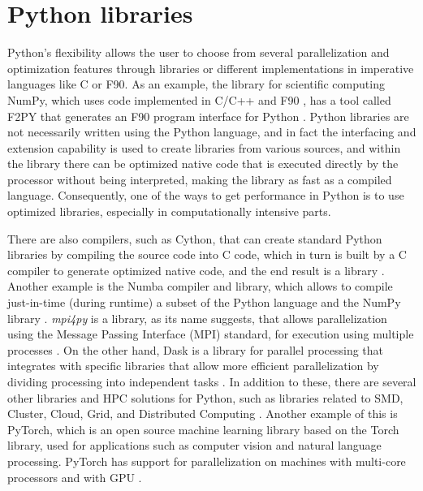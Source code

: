%
%
%
\section{Python libraries}

Python's flexibility allows the user to choose from several parallelization and optimization features through libraries or different implementations in imperative languages like C or F90. As an example, the library for scientific computing NumPy, which uses code implemented in C/C++ and F90 \cite {Walt2011}, has a tool called F2PY that generates an F90 program interface for Python \cite {Peterson2009}. Python libraries are not necessarily written using the Python language, and in fact the interfacing and extension capability is used to create libraries from various sources, and within the library there can be optimized native code that is executed directly by the processor without being interpreted, making the library as fast as a compiled language. Consequently, one of the ways to get performance in Python is to use optimized libraries, especially in computationally intensive parts.

There are also compilers, such as Cython, that can create standard Python libraries by compiling the source code into C code, which in turn is built by a C compiler to generate optimized native code, and the end result is a library \cite {Behnel2010}. Another example is the Numba compiler and library, which allows to compile just-in-time (during runtime) a subset of the Python language and the NumPy library \cite {Lam2015}. \textit {mpi4py} is a library, as its name suggests, that allows parallelization using the Message Passing Interface (MPI) standard, for execution using multiple processes \cite {Dalcin2008}. On the other hand, Dask is a library for parallel processing that integrates with specific libraries that allow more efficient parallelization by dividing processing into independent tasks \cite {Rocklin2015}. In addition to these, there are several other libraries and HPC solutions for Python, such as libraries related to SMD, Cluster, Cloud, Grid, and Distributed Computing \cite {Palach2014}. Another example of this is PyTorch, which is an open source machine learning library based on the Torch library, used for applications such as computer vision and natural language processing. PyTorch has support for parallelization on machines with multi-core processors and with GPU \cite {Ketkar2017}.

